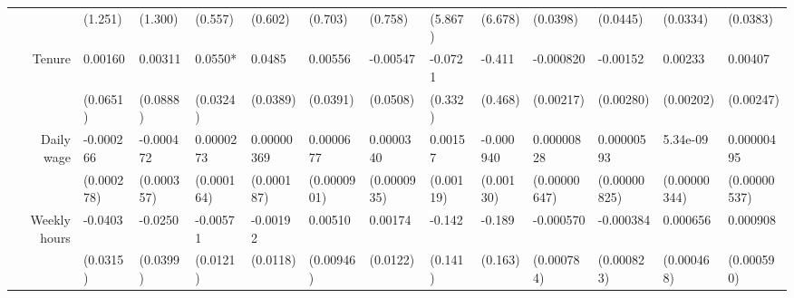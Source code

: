 \begin{tabular}{rrrrrrrrrrrrr}
      & \multicolumn{1}{l}{(1.251)} & \multicolumn{1}{l}{(1.300)} & \multicolumn{1}{l}{(0.557)} & \multicolumn{1}{l}{(0.602)} & \multicolumn{1}{l}{(0.703)} & \multicolumn{1}{l}{(0.758)} & \multicolumn{1}{l}{(5.867)} & \multicolumn{1}{l}{(6.678)} & \multicolumn{1}{l}{(0.0398)} & \multicolumn{1}{l}{(0.0445)} & \multicolumn{1}{l}{(0.0334)} & \multicolumn{1}{l}{(0.0383)} \\
Tenure & \multicolumn{1}{l}{0.00160} & \multicolumn{1}{l}{0.00311} & \multicolumn{1}{l}{0.0550*} & \multicolumn{1}{l}{0.0485} & \multicolumn{1}{l}{0.00556} & \multicolumn{1}{l}{-0.00547} & \multicolumn{1}{l}{-0.0721} & \multicolumn{1}{l}{-0.411} & \multicolumn{1}{l}{-0.000820} & \multicolumn{1}{l}{-0.00152} & \multicolumn{1}{l}{0.00233} & \multicolumn{1}{l}{0.00407} \\
      & \multicolumn{1}{l}{(0.0651)} & \multicolumn{1}{l}{(0.0888)} & \multicolumn{1}{l}{(0.0324)} & \multicolumn{1}{l}{(0.0389)} & \multicolumn{1}{l}{(0.0391)} & \multicolumn{1}{l}{(0.0508)} & \multicolumn{1}{l}{(0.332)} & \multicolumn{1}{l}{(0.468)} & \multicolumn{1}{l}{(0.00217)} & \multicolumn{1}{l}{(0.00280)} & \multicolumn{1}{l}{(0.00202)} & \multicolumn{1}{l}{(0.00247)} \\
Daily wage & \multicolumn{1}{l}{-0.000266} & \multicolumn{1}{l}{-0.000472} & \multicolumn{1}{l}{0.0000273} & \multicolumn{1}{l}{0.00000369} & \multicolumn{1}{l}{0.0000677} & \multicolumn{1}{l}{0.0000340} & \multicolumn{1}{l}{0.00157} & \multicolumn{1}{l}{-0.000940} & \multicolumn{1}{l}{0.00000828} & \multicolumn{1}{l}{0.00000593} & \multicolumn{1}{l}{5.34e-09} & \multicolumn{1}{l}{0.00000495} \\
      & \multicolumn{1}{l}{(0.000278)} & \multicolumn{1}{l}{(0.000357)} & \multicolumn{1}{l}{(0.000164)} & \multicolumn{1}{l}{(0.000187)} & \multicolumn{1}{l}{(0.0000901)} & \multicolumn{1}{l}{(0.0000935)} & \multicolumn{1}{l}{(0.00119)} & \multicolumn{1}{l}{(0.00130)} & \multicolumn{1}{l}{(0.00000647)} & \multicolumn{1}{l}{(0.00000825)} & \multicolumn{1}{l}{(0.00000344)} & \multicolumn{1}{l}{(0.00000537)} \\
Weekly hours & \multicolumn{1}{l}{-0.0403} & \multicolumn{1}{l}{-0.0250} & \multicolumn{1}{l}{-0.00571} & \multicolumn{1}{l}{-0.00192} & \multicolumn{1}{l}{0.00510} & \multicolumn{1}{l}{0.00174} & \multicolumn{1}{l}{-0.142} & \multicolumn{1}{l}{-0.189} & \multicolumn{1}{l}{-0.000570} & \multicolumn{1}{l}{-0.000384} & \multicolumn{1}{l}{0.000656} & \multicolumn{1}{l}{0.000908} \\
      & \multicolumn{1}{l}{(0.0315)} & \multicolumn{1}{l}{(0.0399)} & \multicolumn{1}{l}{(0.0121)} & \multicolumn{1}{l}{(0.0118)} & \multicolumn{1}{l}{(0.00946)} & \multicolumn{1}{l}{(0.0122)} & \multicolumn{1}{l}{(0.141)} & \multicolumn{1}{l}{(0.163)} & \multicolumn{1}{l}{(0.000784)} & \multicolumn{1}{l}{(0.000823)} & \multicolumn{1}{l}{(0.000468)} & \multicolumn{1}{l}{(0.000590)} \\

\end{tabular}
